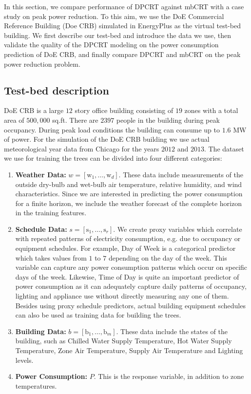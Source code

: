 
In this section, we compare performance of DPCRT against mbCRT with a case study on peak power reduction.
To this aim, we use the DoE Commercial Reference Building (Doe CRB) simulated in EnergyPlus \cite{DeruFieldStuderEtAl2011} as the virtual test-bed building. 
We first describe our test-bed and introduce the data we use, then validate the quality of the DPCRT modeling on the power consumption prediction of DoE CRB, and finally compare DPCRT and mbCRT on the peak power reduction problem.

\subsection{Test-bed description}
DoE CRB is a large $12$ story office building consisting of $19$ zones with a total area of $500,000$ sq.ft. 
There are $2397$ people in the building during peak occupancy. 
During peak load conditions the building can consume up to $1.6$ MW of power. 
For the simulation of the DoE CRB building we use actual meteorological year data from Chicago for the years $2012$ and $2013$. 
The dataset we use for training the trees can be divided into four different categories:
\begin{enumerate}[leftmargin=1cm]
	\item \textbf{Weather Data:} $w = [\mathrm{w}_1,\ldots,\mathrm{w}_d]$. These data include measurements of the outside dry-bulb and wet-bulb air temperature, relative humidity, and wind characteristics. Since we are interested in predicting the power consumption for a finite horizon, we include the weather forecast of the complete horizon in the training features.
	\item \textbf{Schedule Data:} $s = [\mathrm{s}_1,\ldots,\mathrm{s}_r]$. We create proxy variables which correlate with repeated patterns of electricity consumption, e.g. due to occupancy or equipment schedules. For example, Day of Week is a categorical predictor which takes values from $1$ to $7$ depending on the day of the week. This variable can capture any power consumption patterns which occur on specific days of the week. Likewise, Time of Day is quite an important predictor of power consumption as it can adequately capture daily patterns of occupancy, lighting and appliance use without directly measuring any one of them. Besides using proxy schedule predictors, actual building equipment schedules can also be used as training data for building the trees.
	\item \textbf{Building Data:} $b = [\mathrm{b}_1,\ldots,\mathrm{b}_m]$. These data include the states of the building, such as Chilled Water Supply Temperature, Hot Water Supply Temperature, Zone Air Temperature, Supply Air Temperature and Lighting levels.
	\item \textbf{Power Consumption:} $P$. This is the response variable, in addition to zone temperatures. 
\end{enumerate}
